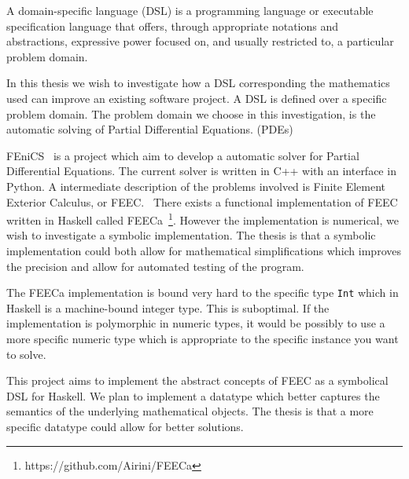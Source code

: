 \documentclass{scrartcl}
\begin{document}
\begin{displayquote}
  A domain-specific language (DSL) is a programming language or executable
  specification language that offers, through appropriate notations and
  abstractions, expressive power focused on, and usually restricted to,
  a particular problem domain.
\end{displayquote}

In this thesis we wish to investigate how a DSL
corresponding the mathematics used can improve an existing software project.
A DSL is defined over a specific problem domain. The problem domain we choose
in this investigation, is the automatic solving of Partial Differential
Equations. (PDEs)

FEniCS~\cite{AlnaesBlechta2015a} is a project which aim to develop a automatic
solver for Partial Differential Equations. The current solver is written in C++
with an interface in Python. A intermediate description of the problems
involved is Finite Element Exterior Calculus, or FEEC.~\cite{arnold2006finite}
There exists a functional implementation of FEEC written in Haskell called
FEECa~\footnote{https://github.com/Airini/FEECa}.  However the implementation
is numerical, we wish to investigate a symbolic implementation.  The thesis is
that a symbolic implementation could both allow for mathematical
simplifications which improves the precision and allow for automated testing of
the program.


The FEECa implementation is bound very hard to the specific type
\lstinline{Int} which in Haskell is a machine-bound integer type. This is
suboptimal.  If the implementation is polymorphic in numeric types, it would be
possibly to use a more specific numeric type which is appropriate to the
specific instance you want to solve.


This project aims to implement the abstract concepts of FEEC as a symbolical
DSL for Haskell.  %
We plan to implement a datatype which better captures the semantics of the
underlying mathematical objects.  The thesis is that a more specific datatype
could allow for better solutions.
\end{document}
